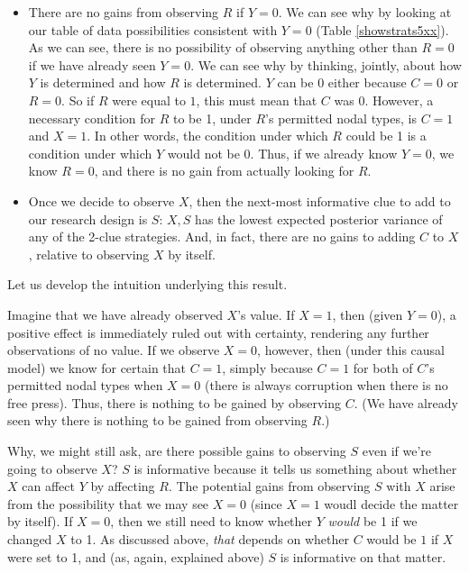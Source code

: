 \documentclass[
  12pt,
]{book}
\begin{document}
\begin{itemize}
\item
  There are no gains from observing \(R\) if \(Y=0\). We can see why by looking at our table of data possibilities consistent with \(Y=0\) (Table \ref{showstrats5xx}). As we can see, there is no possibility of observing anything other than \(R=0\) if we have already seen \(Y=0\). We can see why by thinking, jointly, about how \(Y\) is determined and how \(R\) is determined. \(Y\) can be 0 either because \(C=0\) or \(R=0\). So if \(R\) were equal to \(1\), this must mean that \(C\) was \(0\). However, a necessary condition for \(R\) to be 1, under \(R\)'s permitted nodal types, is \(C=1\) and \(X=1\). In other words, the condition under which \(R\) could be 1 is a condition under which \(Y\) would not be 0. Thus, if we already know \(Y=0\), we know \(R=0\), and there is no gain from actually looking for \(R\).
\item
  Once we decide to observe \(X\), then the next-most informative clue to add to our research design is \(S\): \(X, S\) has the lowest expected posterior variance of any of the 2-clue strategies. And, in fact, there are no gains to adding \(C\) to \(X\), relative to observing \(X\) by itself.
\end{itemize}

Let us develop the intuition underlying this result.

Imagine that we have already observed \(X\)'s value. If \(X=1\), then (given \(Y=0\)), a positive effect is immediately ruled out with certainty, rendering any further observations of no value. If we observe \(X=0\), however, then (under this causal model) we know for certain that \(C=1\), simply because \(C=1\) for both of \(C\)'s permitted nodal types when \(X=0\) (there is always corruption when there is no free press). Thus, there is nothing to be gained by observing \(C\). (We have already seen why there is nothing to be gained from observing \(R\).)

Why, we might still ask, are there possible gains to observing \(S\) even if we're going to observe \(X\)? \(S\) is informative because it tells us something about whether \(X\) can affect \(Y\) by affecting \(R\). The potential gains from observing \(S\) with \(X\) arise from the possibility that we may see \(X=0\) (since \(X=1\) woudl decide the matter by itself). If \(X=0\), then we still need to know whether \(Y\) \emph{would} be 1 if we changed \(X\) to 1. As discussed above, \emph{that} depends on whether \(C\) would be \(1\) if \(X\) were set to 1, and (as, again, explained above) \(S\) is informative on that matter.
\end{document}
